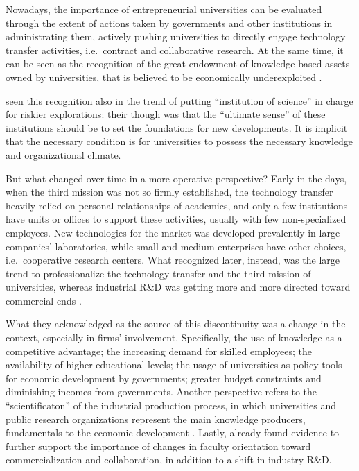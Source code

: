 Nowadays, the importance of entrepreneurial universities can be evaluated through the extent of actions taken by governments and other institutions in administrating them, actively pushing universities to directly engage technology transfer activities, i.e.\ contract and collaborative research. At the same time, it can be seen as the recognition of the great endowment of knowledge-based assets owned by universities, that is believed to be economically underexploited \citep{Tijssen2006}. 

\citet{Balconi2006} seen this recognition also in the trend of putting \enquote{institution of science} in charge for riskier explorations: their though was that the \enquote{ultimate sense} of these institutions should be to set the foundations for new developments. It is implicit that the necessary condition is for universities to possess the necessary knowledge and organizational climate.

But what changed over time in a more operative perspective? Early in the days, when the third mission was not so firmly established, the technology transfer heavily relied on personal relationships of academics, and only a few institutions have units or offices to support these activities, usually with few non-specialized employees. New technologies for the market was developed prevalently in large companies' laboratories, while small and medium enterprises have other choices, i.e.\ cooperative research centers. What \citet{Geuna2009} recognized later, instead, was the large trend to professionalize the technology transfer and the third mission of universities, whereas industrial R\&D was getting more and more directed toward commercial ends \citep{Fritsch2007}.

What they acknowledged as the source of this discontinuity was a change in the context, especially in firms' involvement. Specifically, the use of knowledge as a competitive advantage; the increasing demand for skilled employees; the availability of higher educational levels; the usage of universities as policy tools for economic development by governments; greater budget constraints and diminishing incomes from governments. Another perspective refers to the \enquote{scientificaton} of the industrial production process, in which universities and public research organizations represent the main knowledge producers, fundamentals to the economic development \citep{Balderi2007}. Lastly, already \citet{Thursby2002} found evidence to further support the importance of changes in faculty orientation toward commercialization and collaboration, in addition to a shift in industry R\&D.

